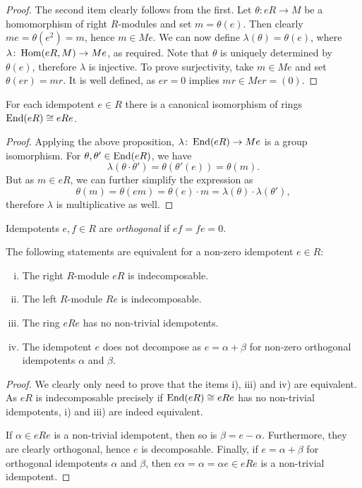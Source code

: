 \begin{proof}
The second item clearly follows from the first. Let
$\theta \colon eR \to M$ be a homomorphism of right $R$-modules and
set $m = \theta(e)$. Then clearly $me = \theta(e^2) = m$, hence
$m \in Me$. We can now define $\lambda(\theta) = \theta(e)$, where
$\lambda \colon \operatorname{Hom}(eR, M) \to Me$, as required. Note that
$\theta$ is uniquely determined by $\theta(e)$, therefore $\lambda$
is injective. To prove surjectivity, take $m \in Me$ and set
$\theta(er) = mr$. It is well defined, as $er = 0$ implies
$mr \in Mer = (0)$.
\end{proof}

\begin{posledica}
For each idempotent $e \in R$ there is a canonical isomorphism of
rings $\operatorname{End}(eR) \cong eRe$.
\end{posledica}

\begin{proof}
Applying the above proposition, $\lambda \colon \operatorname{End}(eR) \to Me$ is
a group isomorphism. For $\theta, \theta' \in \operatorname{End}(eR)$, we have
\[
\lambda(\theta \cdot \theta') =
\theta(\theta'(e)) =
\theta(m).
\]
But as $m \in eR$, we can further simplify the expression as
\[
\theta(m) =
\theta(em) =
\theta(e) \cdot m =
\lambda(\theta) \cdot \lambda(\theta'),
\]
therefore $\lambda$ is multiplicative as well.
\end{proof}

\begin{definicija}
Idempotents $e, f \in R$ are
\emph{orthogonal} if $ef = fe = 0$.
\end{definicija}

\begin{trditev}
The following statements are equivalent for a non-zero idempotent
$e \in R$:

\begin{enumerate}[i)]
\item The right $R$-module $eR$ is indecomposable.
\item The left $R$-module $Re$ is indecomposable.
\item The ring $eRe$ has no non-trivial idempotents.
\item The idempotent $e$ does not decompose as $e = \alpha + \beta$
for non-zero orthogonal idempotents $\alpha$ and $\beta$.
\end{enumerate}
\end{trditev}

\begin{proof}
We clearly only need to prove that the items i), iii) and iv) are
equivalent. As $eR$ is indecomposable precisely if
$\operatorname{End}(eR) \cong eRe$ has no non-trivial idempotents, i) and iii)
are indeed equivalent.

If $\alpha \in eRe$ is a non-trivial idempotent, then so is
$\beta = e - \alpha$. Furthermore, they are clearly orthogonal,
hence $e$ is decomposable. Finally, if $e = \alpha + \beta$ for
orthogonal idempotents $\alpha$ and $\beta$, then
$e \alpha = \alpha = \alpha e \in eRe$ is a non-trivial idempotent.
\end{proof}

